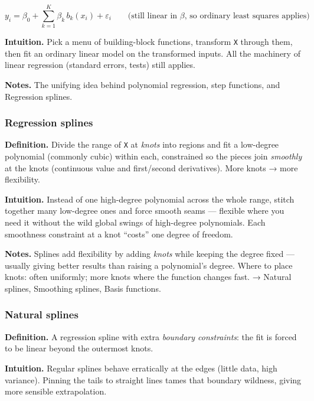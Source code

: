 \documentclass[
  10pt,
  letterpaper,
  onecolumn]{article}
\begin{document}
\begin{equation*}
y_i=\beta_0+\sum_{k=1}^{K}\beta_k\,b_k(x_i)+\varepsilon_i
\qquad\text{(still linear in }\beta\text{, so ordinary least squares applies)}
\end{equation*}

\textbf{Intuition.} Pick a menu of building-block functions, transform
\texttt{X} through them, then fit an ordinary linear model on the
transformed inputs. All the machinery of linear regression (standard
errors, tests) still applies.

\textbf{Notes.} The unifying idea behind polynomial regression, step
functions, and Regression splines.

\hypertarget{regression-splines}{%
\subsubsection{Regression splines}\label{regression-splines}}

\textbf{Definition.} Divide the range of \texttt{X} at \emph{knots} into
regions and fit a low-degree polynomial (commonly cubic) within each,
constrained so the pieces join \emph{smoothly} at the knots (continuous
value and first/second derivatives). More knots → more flexibility.

\textbf{Intuition.} Instead of one high-degree polynomial across the
whole range, stitch together many low-degree ones and force smooth seams
--- flexible where you need it without the wild global swings of
high-degree polynomials. Each smoothness constraint at a knot ``costs''
one degree of freedom.

\textbf{Notes.} Splines add flexibility by adding \emph{knots} while
keeping the degree fixed --- usually giving better results than raising
a polynomial's degree. Where to place knots: often uniformly; more knots
where the function changes fast. → Natural splines, Smoothing splines,
Basis functions.

\hypertarget{natural-splines}{%
\subsubsection{Natural splines}\label{natural-splines}}

\textbf{Definition.} A regression spline with extra \emph{boundary
constraints}: the fit is forced to be linear beyond the outermost knots.

\textbf{Intuition.} Regular splines behave erratically at the edges
(little data, high variance). Pinning the tails to straight lines tames
that boundary wildness, giving more sensible extrapolation.
\end{document}
